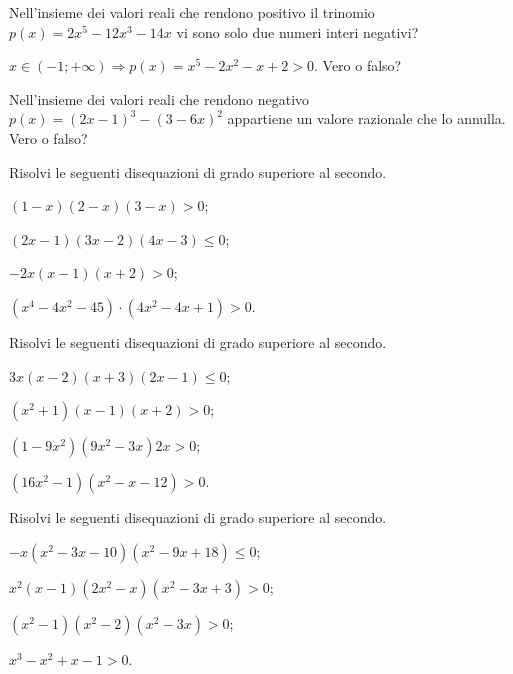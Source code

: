 \begin{esercizio}
\label{ese:4.35}
Nell’insieme dei valori reali che rendono positivo il trinomio $p(x)=2x^5-12x^3-14x$ vi sono solo due numeri interi negativi?
\end{esercizio}

\begin{esercizio}
 \label{ese:4.36}
$x\in (-1;+\infty )\Rightarrow p(x)=x^5-2x^2-x+2>0$. Vero o falso?
\end{esercizio}

\begin{esercizio}
\label{ese:4.37}
Nell'insieme dei valori reali che rendono negativo $p(x)=(2x-1)^3-(3-6x)^2$ appartiene un valore razionale che lo annulla. Vero o falso?
\end{esercizio}
\newpage
\begin{esercizio}[\Ast]
\label{ese:4.38}
Risolvi le seguenti disequazioni di grado superiore al secondo.
\begin{multicols}{2}
\begin{enumeratea}
\item $(1-x)(2-x)(3-x)>0$;
\item $(2x-1)(3x-2)(4x-3)\le 0$;
\item $-2x(x-1)(x+2)>0$;
\item $ \left(x^4-4x^2-45\right)\cdot \left(4x^2-4x+1\right)>0 $.
\end{enumeratea}
\end{multicols}
\end{esercizio}

\begin{esercizio}[\Ast]
\label{ese:4.39}
Risolvi le seguenti disequazioni di grado superiore al secondo.
\begin{multicols}{2}
\begin{enumeratea}
\item $3x(x-2)(x+3)(2x-1)\le 0$;
\item $\left(x^2+1\right)(x-1)(x+2)>0$;
\item $\left(1-9x^2\right)\left(9x^2-3x\right)2x>0$;
\item $\left(16x^2-1\right)\left(x^2-x-12\right)>0$.
\end{enumeratea}
\end{multicols}
\end{esercizio}

\begin{esercizio}[\Ast]
\label{ese:4.40}
Risolvi le seguenti disequazioni di grado superiore al secondo.
\begin{multicols}{2}
\begin{enumeratea}
\item $-x\left(x^2-3x-10\right)\left(x^2-9x+18\right)\le 0$;
\item $x^2(x-1)\left(2x^2-x\right)\left(x^2-3x+3\right)>0$;
\item $\left(x^2-1\right)\left(x^2-2\right)\left(x^2-3x\right)>0$;
\item $x^3-x^2+x-1>0$.
\end{enumeratea}
\end{multicols}
\end{esercizio}

